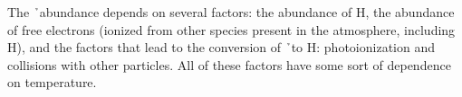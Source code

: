 The \h\ abundance depends on several factors: the abundance of H, the
abundance of free electrons (ionized from other species present in the
atmosphere, including H), and the factors that lead to the conversion
of \h\ to H: photoionization and collisions with other particles.  All
of these factors have some sort of dependence on temperature.



